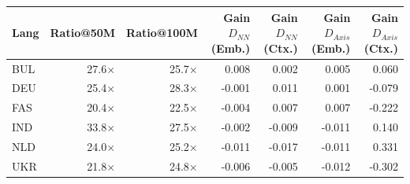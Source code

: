 \begin{tabular}{@{}lrrrrrr@{}}
\toprule
Lang & Ratio@50M & Ratio@100M & Gain $D_{NN}$ (Emb.) & Gain $D_{NN}$ (Ctx.) & Gain $D_{Axis}$ (Emb.) & Gain $D_{Axis}$ (Ctx.) \\
\midrule
BUL & 27.6$\times$ & 25.7$\times$ & 0.008 & 0.002 & 0.005 & 0.060 \\
DEU & 25.4$\times$ & 28.3$\times$ & -0.001 & 0.011 & 0.001 & -0.079 \\
FAS & 20.4$\times$ & 22.5$\times$ & -0.004 & 0.007 & 0.007 & -0.222 \\
IND & 33.8$\times$ & 27.5$\times$ & -0.002 & -0.009 & -0.011 & 0.140 \\
NLD & 24.0$\times$ & 25.2$\times$ & -0.011 & -0.017 & -0.011 & 0.331 \\
UKR & 21.8$\times$ & 24.8$\times$ & -0.006 & -0.005 & -0.012 & -0.302 \\
\bottomrule
\end{tabular}
